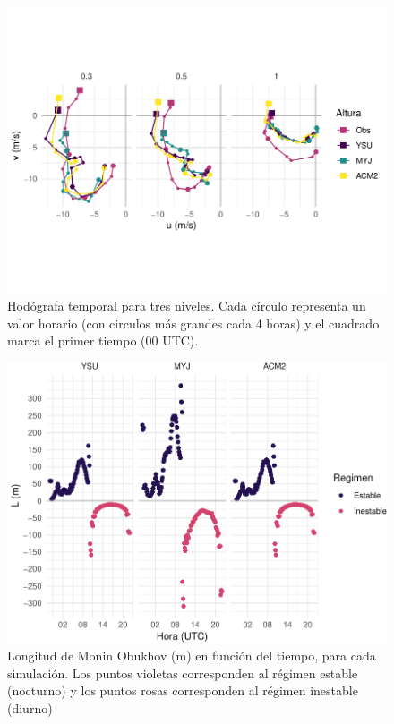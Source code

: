 \documentclass[12pt,spanish,oneside, a4paper]{book}
\begin{document}
\begin{figure}

{\centering \includegraphics{00_Paper_files/figure-latex/hodografa-wrf-1} 

}

\caption{Hodógrafa temporal para tres niveles. Cada círculo representa un valor horario (con circulos más grandes cada 4 horas) y el cuadrado marca el primer tiempo (00 UTC). \label{hodografa-mod}}\label{fig:hodografa-wrf}
\end{figure}

\begin{figure}

{\centering \includegraphics{00_Paper_files/figure-latex/L-parm-1} 

}

\caption{Longitud de Monin Obukhov (m) en función del tiempo, para cada simulación. Los puntos violetas corresponden al régimen estable (nocturno) y los puntos rosas corresponden al régimen inestable (diurno) \label{L-param}}\label{fig:L-parm}
\end{figure}
\end{document}
